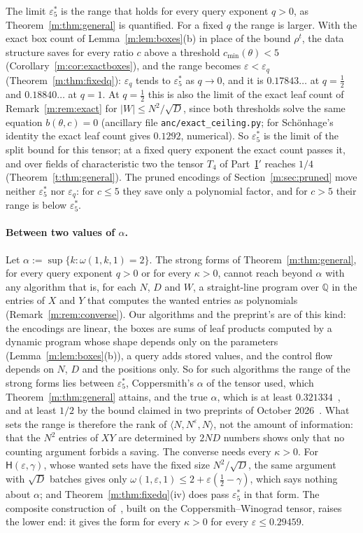 \documentclass[11pt]{article}
\makeatletter
\theoremstyle{definition}
\theoremstyle{remark}
\newcommand{\Q}{\mathbb{Q}}
\newcommand{\es}{\varepsilon^*_5}
\newcommand{\Hyp}{\mathsf{H}}
\newcommand{\HintedOMvRfourteen}{0.18840}%
\newcommand{\HypHalfRfourteen}{0.17843}%
\newcommand{\ThmDRangePzero}{0.29459}%
\newcommand{\AlphaVXXZ}{0.321334}%
\newcommand{\CPref}[1]{\ifcsname cpref@#1\endcsname\csname cpref@#1\endcsname\else\VTODO{label #1 of the other paper undefined}\fi}
\DeclareRobustCommand{\VTODO}[1]{{\color{red}\textbf{[TODO:} #1\textbf{]}}}
\makeatother
\begin{document}
The limit $\es$ is the range that holds for every query exponent $q>0$, as Theorem~\ref{m:thm:general} is quantified. For a fixed $q$ the range is larger. With the exact box count of Lemma~\ref{m:lem:boxes}(b) in place of the bound $\rho^t$, the data structure saves for every ratio $c$ above a threshold $c_{\min}(\theta)<5$ (Corollary~\ref{m:cor:exactboxes}), and the range becomes $\varepsilon<\varepsilon_q$ (Theorem~\ref{m:thm:fixedq}): $\varepsilon_q$ tends to $\es$ as $q\to0$, and it is $\HypHalfRfourteen\ldots$ at $q=\frac12$ and $\HintedOMvRfourteen\ldots$ at $q=1$. At $q=\frac12$ this is also the limit of the exact leaf count of Remark~\ref{m:rem:exact} for $|W|\le N^2/\sqrt D$, since both thresholds solve the same equation $b(\theta,c)=0$ (ancillary file \texttt{anc/exact\_ceiling.py}; for Schönhage's identity the exact leaf count gives $0.1292$, numerical). So $\es$ is the limit of the split bound for this tensor; at a fixed query exponent the exact count passes it, and over fields of characteristic two the tensor $T_4$ of Part~\hyperref[t:partIp]{I$'$} reaches $1/4$ (Theorem~\ref{t:thm:general}). The pruned encodings of Section~\ref{m:sec:pruned} move neither $\es$ nor $\varepsilon_q$: for $c\le5$ they save only a polynomial factor, and for $c>5$ their range is below $\es$.

\paragraph{Between two values of $\alpha$.} Let $\alpha:=\sup\{k:\omega(1,k,1)=2\}$. The strong forms of Theorem~\ref{m:thm:general}, for every query exponent $q>0$ or for every $\kappa>0$, cannot reach beyond $\alpha$ with any algorithm that is, for each $N$, $D$ and $W$, a straight-line program over $\Q$ in the entries of $X$ and $Y$ that computes the wanted entries as polynomials (Remark~\ref{m:rem:converse}). Our algorithms and the preprint's are of this kind: the encodings are linear, the boxes are sums of leaf products computed by a dynamic program whose shape depends only on the parameters (Lemma~\ref{m:lem:boxes}(b)), a query adds stored values, and the control flow depends on $N$, $D$ and the positions only. So for such algorithms the range of the strong forms lies between $\es$, Coppersmith's $\alpha$ of the tensor used, which Theorem~\ref{m:thm:general} attains, and the true $\alpha$, which is at least $\AlphaVXXZ$~\cite{VXXZ24}, and at least $1/2$ by the bound claimed in two preprints of October 2026~\cite{AvBZ26,Uzn26}. What sets the range is therefore the rank of $\langle N,N^\varepsilon,N\rangle$, not the amount of information: that the $N^2$ entries of $XY$ are determined by $2ND$ numbers shows only that no counting argument forbids a saving. The converse needs every $\kappa>0$. For $\Hyp(\varepsilon,\gamma)$, whose wanted sets have the fixed size $N^2/\sqrt D$, the same argument with $\sqrt D$ batches gives only $\omega(1,\varepsilon,1)\le2+\varepsilon(\frac12-\gamma)$, which says nothing about $\alpha$; and Theorem~\ref{m:thm:fixedq}(iv) does pass $\es$ in that form. The composite construction of~\cite[Corollary~\CPref{cp:A2}]{CP}, built on the Coppersmith--Winograd tensor, raises the lower end: it gives the form for every $\kappa>0$ for every $\varepsilon\le\ThmDRangePzero$.
\end{document}
